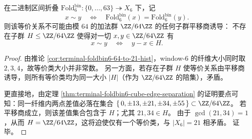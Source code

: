 \begin{proposition}\label{prop:window6-no-translation-quotient-fiber}
在二进制区间折叠 \(\mathrm{Fold}^{\mathrm{bin}}_6:\{0,\dots,63\}\twoheadrightarrow X_6\) 下，记
\[
x\sim y\quad\Longleftrightarrow\quad \mathrm{Fold}^{\mathrm{bin}}_6(x)=\mathrm{Fold}^{\mathrm{bin}}_6(y).
\]
则该等价关系不可能由模 \(64\) 的加法群 \(\ZZ/64\ZZ\) 的任何子群平移商诱导：
不存在子群 \(H\le \ZZ/64\ZZ\) 使得对一切 \(x,y\in\ZZ/64\ZZ\) 有
\[
x\sim y\quad\Longleftrightarrow\quad y-x\in H.
\]
\end{proposition}
\begin{proof}
由推论 \ref{cor:terminal-foldbin6-64-to-21-hist}，window-\(6\) 的纤维大小同时取 \(2,3,4\)，故等价类大小并非常数。
另一方面，若存在子群 \(H\) 使等价关系由平移商诱导，则所有等价类均为同一大小 \(|H|\)（作为 \(\ZZ/64\ZZ\) 的陪集），矛盾。
\par
更直接地，由定理 \ref{thm:terminal-foldbin6-cube-edge-separation} 的证明要点可知：同一纤维内两点差值必落在集合
\(
\{\,0,\pm 13,\pm 21,\pm 34,\pm 55\,\}\subset \ZZ/64\ZZ
\)。
若平移商成立，则该差值集合包含于 \(H\)；尤其 \(21,34\in H\)。
由于 \(\gcd(21,34)=1\)，从而 \(H=\ZZ/64\ZZ\)，这将迫使仅有一个等价类，与 \(|X_6|=21\) 相矛盾。
证毕。
\end{proof}

